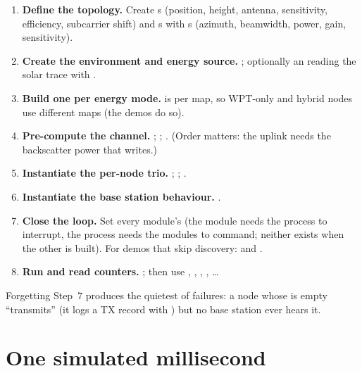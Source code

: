 \begin{enumerate}[label=\textbf{Step \arabic*.},leftmargin=1.6cm]
 \item \textbf{Define the topology.} Create s (position, height, antenna, sensitivity, efficiency, subcarrier shift) and s with s (azimuth, beamwidth, power, gain, sensitivity).
 \item \textbf{Create the environment and energy source.} ; optionally an  reading the solar trace with .
 \item \textbf{Build one  per energy mode.}  is per map, so WPT-only and hybrid nodes use different maps (the demos do so).
 \item \textbf{Pre-compute the channel.} ; ; . (Order matters: the uplink needs the backscatter power that  writes.)
 \item \textbf{Instantiate the per-node trio.} ; ; .
 \item \textbf{Instantiate the base station behaviour.} .
 \item \textbf{Close the loop.} Set every module's  (the module needs the process to interrupt, the process needs the modules to command; neither exists when the other is built). For demos that skip discovery:  and .
 \item \textbf{Run and read counters.} ; then use , , , , \dots
\end{enumerate}
Forgetting Step~7 produces the quietest of failures: a node whose  is empty ``transmits'' (it logs a TX record with ) but no base station ever hears it.

\section{One simulated millisecond}
\label{sec:onems}

